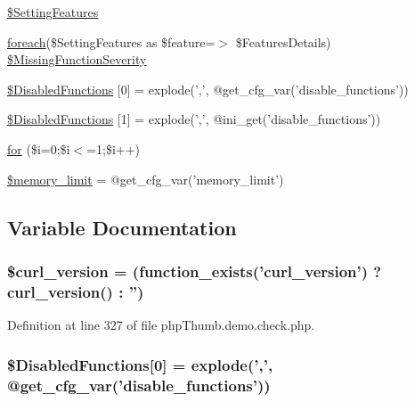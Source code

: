 \begin{DoxyCompactItemize}
\item 
\hyperlink{php_thumb_8demo_8check_8php_a3221b39580482af846709d68ada2832e}{\$\-Setting\-Features}
\item 
\hyperlink{php_thumb_8demo_8demo_8php_a9caa026f841c5a6057418795d37e0ef9}{foreach}(\$\-Setting\-Features as \*
\$feature=$>$ \$\-Features\-Details) \hyperlink{php_thumb_8demo_8check_8php_a750f7e0c157758d992d263a4000e4d31}{\$\-Missing\-Function\-Severity}
\item 
\hyperlink{php_thumb_8demo_8check_8php_ac9ab9399a05784bc20dcedde7b573593}{\$\-Disabled\-Functions} \mbox{[}0\mbox{]} = explode(',', @get\-\_\-cfg\-\_\-var('disable\-\_\-functions'))
\item 
\hyperlink{php_thumb_8demo_8check_8php_a5343e3103a76a26375f2a0dd78e53404}{\$\-Disabled\-Functions} \mbox{[}1\mbox{]} = explode(',', @ini\-\_\-get('disable\-\_\-functions'))
\item 
\hyperlink{php_thumb_8demo_8check_8php_a033a4ad9dabb361619d4269baa32c2da}{for} (\$i=0;\$i$<$=1;\$i++)
\item 
\hyperlink{php_thumb_8demo_8check_8php_aa20d90128c90677dcc442774ebc34b60}{\$memory\-\_\-limit} = @get\-\_\-cfg\-\_\-var('memory\-\_\-limit')
\end{DoxyCompactItemize}


\subsection{\-Variable \-Documentation}
\hypertarget{php_thumb_8demo_8check_8php_aaf650bea5bf4627e22c03e71b845b87c}{
\subsubsection[{\$curl\-\_\-version}]{\setlength{\rightskip}{0pt plus 5cm}\$curl\-\_\-version = (function\-\_\-exists('curl\-\_\-version') ? curl\-\_\-version() \-: '')}}\label{php_thumb_8demo_8check_8php_aaf650bea5bf4627e22c03e71b845b87c}


\-Definition at line 327 of file php\-Thumb.\-demo.\-check.\-php.

\hypertarget{php_thumb_8demo_8check_8php_ac9ab9399a05784bc20dcedde7b573593}{
\subsubsection[{\$\-Disabled\-Functions}]{\setlength{\rightskip}{0pt plus 5cm}\$\-Disabled\-Functions\mbox{[}0\mbox{]} = explode(',', @get\-\_\-cfg\-\_\-var('disable\-\_\-functions'))}}\label{php_thumb_8demo_8check_8php_ac9ab9399a05784bc20dcedde7b573593}


